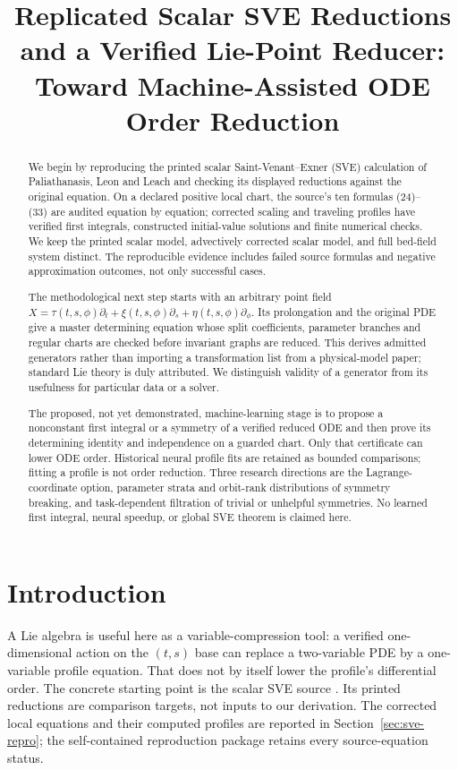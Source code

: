 \documentclass[11pt]{article}
\title{Replicated Scalar SVE Reductions and a Verified Lie-Point Reducer:\\
Toward Machine-Assisted ODE Order Reduction}
\author{}
\date{}
\theoremstyle{definition}
\begin{document}
\maketitle
\begin{abstract}
We begin by reproducing the printed scalar Saint-Venant--Exner (SVE)
calculation of Paliathanasis, Leon and Leach and checking its displayed
reductions against the original equation. On a declared positive local chart,
the source's ten formulas (24)--(33) are audited equation by equation; corrected
scaling and traveling profiles have verified first integrals, constructed
initial-value solutions and finite numerical checks. We keep the printed
scalar model, advectively corrected scalar model, and full bed-field system
distinct. The reproducible evidence includes failed source formulas
and negative approximation outcomes, not only successful cases.

The methodological next step starts with an arbitrary point field
$X=\tau(t,s,\phi)\partial_t+\xi(t,s,\phi)\partial_s+
\eta(t,s,\phi)\partial_\phi$. Its prolongation and the original PDE give a
master determining equation whose split coefficients, parameter branches and
regular charts are checked before invariant graphs are reduced. This derives
admitted generators rather than importing a transformation list from a
physical-model paper; standard Lie theory is duly attributed. We distinguish
validity of a generator from its usefulness for particular data or a solver.

The proposed, not yet demonstrated, machine-learning stage is to propose a
nonconstant first integral or a symmetry of a verified reduced ODE and then
prove its determining identity and independence on a guarded chart. Only that
certificate can lower ODE order. Historical neural profile fits are retained
as bounded comparisons; fitting a profile is not order reduction. Three
research directions are the Lagrange-coordinate option, parameter strata and
orbit-rank distributions of symmetry breaking, and task-dependent filtration
of trivial or unhelpful symmetries. No learned first integral, neural speedup,
or global SVE theorem is claimed here.
\end{abstract}

\section{Introduction}
A Lie algebra is useful here as a variable-compression tool: a verified
one-dimensional action on the $(t,s)$ base can replace a two-variable PDE
by a one-variable profile equation. That does not by itself lower the
profile's differential order. The concrete starting point is the scalar SVE
source \cite{ap}. Its printed reductions are comparison targets, not inputs
to our derivation. The corrected local equations and their computed profiles
are reported in Section~\ref{sec:sve-repro}; the self-contained reproduction
package retains every source-equation status.
\end{document}
